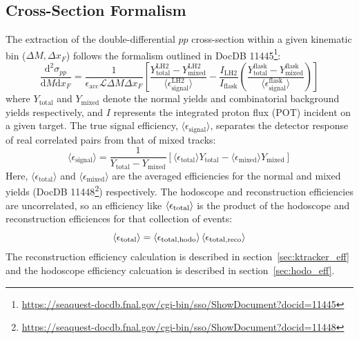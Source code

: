 \documentclass[11pt]{article}
\newcommand{\diffd}{\mathrm{d}}
\begin{document}
\subsection{Cross-Section Formalism}
The extraction of the double-differential $pp$ cross-section within a given kinematic bin ($\Delta M, \Delta x_F$) follows the formalism outlined in DocDB 11445\footnote{\url{https://seaquest-docdb.fnal.gov/cgi-bin/sso/ShowDocument?docid=11445}}:
\begin{equation}
    \frac{\diffd^{2}\sigma_{pp}}{\diffd M \diffd x_{F}} = \frac{1}{\epsilon_{\text{acc}} \mathcal{L} \Delta M \Delta x_{F}} 
    \left[ 
        \frac{Y^{\text{LH2}}_{\text{total}} - Y^{\text{LH2}}_{\text{mixed}}}{\langle\epsilon^{\text{LH2}}_{\text{signal}}\rangle} 
        - \frac{I_{\text{LH2}}}{I_{\text{flask}}} 
        \left( \frac{Y^{\text{flask}}_{\text{total}} - Y^{\text{flask}}_{\text{mixed}}}{\langle\epsilon^{\text{flask}}_{\text{signal}}\rangle} \right)
    \right]
    \label{eq:modified_cross_section}
\end{equation}
where $Y_{\text{total}}$ and $Y_{\text{mixed}}$ denote the normal yields and combinatorial background yields respectively, and $I$ represents the integrated proton flux (POT) incident on a given target. The true signal efficiency, $\langle\epsilon_{\text{signal}}\rangle$, separates the detector response of real correlated pairs from that of mixed tracks:
\begin{equation}
    \label{eq:avg_signal_eff}
    \langle\epsilon_{\text{signal}}\rangle = \frac{1}{Y_{\text{total}} - Y_{\text{mixed}}}\left[\langle\epsilon_{\text{total}}\rangle Y_{\text{total}} - \langle\epsilon_{\text{mixed}}\rangle Y_{\text{mixed}}\right]
\end{equation}
Here, $\langle\epsilon_{\text{total}}\rangle$ and $\langle\epsilon_{\text{mixed}}\rangle$ are the averaged efficiencies for the normal and mixed yields (DocDB 11448\footnote{\url{https://seaquest-docdb.fnal.gov/cgi-bin/sso/ShowDocument?docid=11448}}) respectively.  The hodoscope and reconstruction efficiencies are uncorrelated, so an efficiency like $\left<\epsilon_{\rm total}\right>$ is the product of the hodoscope and reconstruction efficiences for that collection of events:
\begin{equation}
   \left<\epsilon_{\rm total}\right>=\left<\epsilon_{\rm total,hodo}\right> \left<\epsilon_{\rm total,reco}\right>
\end{equation}
The reconstruction efficiency calculation is described in section~\ref{sec:ktracker_eff} and the hodoscope efficiency calcuation is described in section~\ref{sec:hodo_eff}.
\end{document}
